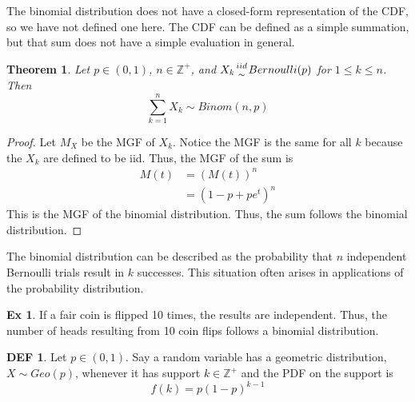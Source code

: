 \documentclass{article}
\newtheorem{theorem}{Theorem}
\theoremstyle{definition}\newtheorem{definition}{DEF}
\theoremstyle{definition}\newtheorem{example}{Ex}
\theoremstyle{lemma}\newtheorem{lemma}{Lemma}
\theoremstyle{corrolary}\newtheorem{corrolary}{Cor}
\begin{document}
The binomial distribution does not have a closed-form representation of the CDF, so we have not defined one here.
The CDF can be defined as a simple summation, but that sum does not have a simple evaluation in general.

\begin{theorem}\label{sum_bernoulli}
Let $p\in (0,1)$, $n\in \mathbb{Z}^+$, and $X_k  { {iid} \atop \sim} Bernoulli(p)$ for $1\leq k\leq n$.
Then
\begin{equation}
\sum_{k=1}^n X_k \sim Binom(n,p)
\end{equation}
\end{theorem}
\begin{proof}
Let $M_X$ be the MGF of $X_k$.
Notice the MGF is the same for all $k$ because the $X_k$ are defined to be iid.
Thus, the MGF of the sum is
\begin{align*}
M(t)&=\left(M(t)\right)^n\\
&=\left( 1-p+pe^t\right)^n
\end{align*}
This is the MGF of the binomial distribution.
Thus, the sum follows the binomial distribution.
\end{proof}

The binomial distribution can be described as the probability that $n$ independent Bernoulli trials result in $k$ successes.
This situation often arises in applications of the probability distribution.\\

\begin{example}
If a fair coin is flipped 10 times, the results are independent.
Thus, the number of heads resulting from 10 coin flips follows a binomial distribution.
\end{example}

\begin{definition}
Let $p\in (0,1)$.
Say a random variable has a geometric distribution, $X\sim Geo(p)$, whenever it has support $k\in \mathbb{Z}^+$ and the PDF on the support is
\begin{equation}
f(k)=p(1-p)^{k-1}
\end{equation}
\end{definition}
\end{document}
